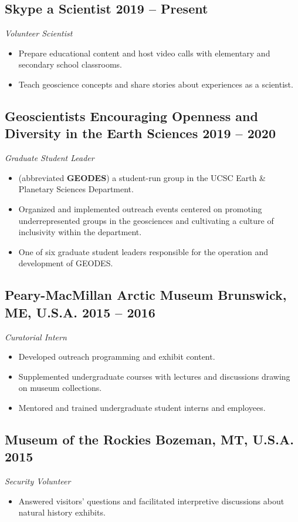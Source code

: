 \documentclass[10pt]{article}
\begin{document}
\subsection*{\textbf{Skype a Scientist} \hfill 2019 – Present}
\textit{Volunteer Scientist}
\begin{itemize}
	\item Prepare educational content and host video calls with elementary and secondary school classrooms.
	\item Teach geoscience concepts and share stories about experiences as a scientist.
\end{itemize}

\subsection*{\textbf{Geoscientists Encouraging Openness and Diversity in the Earth Sciences} \hfill 2019 – 2020}
\textit{Graduate Student Leader}
\begin{itemize}
	\item (abbreviated \textbf{GEODES}) a student-run group in the UCSC Earth \& Planetary Sciences Department.
	\item Organized and implemented outreach events centered on promoting underrepresented groups in the geosciences and cultivating a culture of inclusivity within the department.
	\item One of six graduate student leaders responsible for the operation and development of GEODES.
\end{itemize}

\subsection*{\textbf{Peary-MacMillan Arctic Museum} \hspace{15pt} Brunswick, ME, U.S.A. \hfill 2015 – 2016}
\textit{Curatorial Intern}
\begin{itemize}
	\item Developed outreach programming and exhibit content.
	\item Supplemented undergraduate courses with lectures and discussions drawing on museum collections.
	\item Mentored and trained undergraduate student interns and employees.
\end{itemize}

\subsection*{\textbf{Museum of the Rockies} \hspace{15pt} Bozeman, MT, U.S.A. \hfill 2015}
\textit{Security Volunteer}
\begin{itemize}
	\item Answered visitors' questions and facilitated interpretive discussions about natural history exhibits.
\end{itemize}
\end{document}
